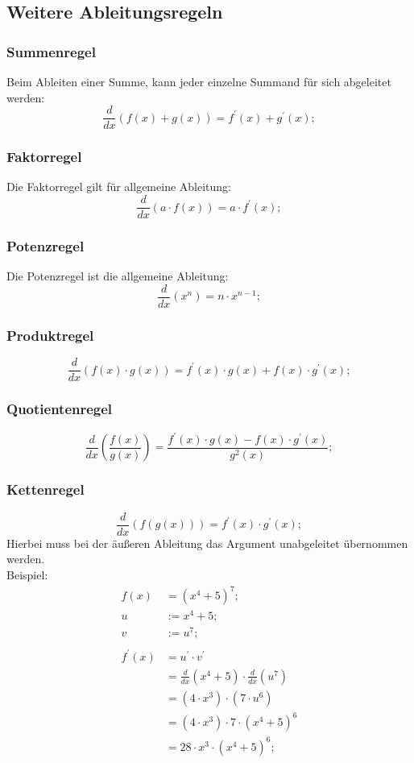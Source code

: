 \documentclass[a4paper]{article}
\begin{document}
\subsection{Weitere Ableitungsregeln}

\subsubsection{Summenregel}
Beim Ableiten einer Summe, kann jeder einzelne Summand für sich abgeleitet werden:
\[
	\frac{d}{dx} \left( f(x) + g(x) \right) = f^\prime(x) + g^\prime(x) ;
\]

\subsubsection{Faktorregel}
Die Faktorregel gilt für allgemeine Ableitung:
\[
	\frac{d}{dx} \left( a \cdot f(x) \right) = a \cdot f^\prime(x);
\]

\subsubsection{Potenzregel}
Die Potenzregel ist die allgemeine Ableitung:
\[
	\frac{d}{dx} \left( x^n \right) = n \cdot x^{n - 1} ;
\]

\subsubsection{Produktregel}
\[
	\frac{d}{dx} \left( f(x) \cdot g(x) \right) = f^\prime(x) \cdot g(x) + f(x) \cdot g^\prime(x) ;
\]

\subsubsection{Quotientenregel}
\[
	\frac{d}{dx} \left( \frac{f(x)}{g(x)} \right) = \frac{f^\prime(x) \cdot g(x) - f(x) \cdot g^\prime(x)}{ g^2(x) } ;
\]

\subsubsection{Kettenregel}
\[
	\frac{d}{dx} \left( f(g(x))  \right) = f^\prime(x) \cdot g^\prime(x) ;
\]
Hierbei muss bei der äußeren Ableitung das Argument unabgeleitet übernommen werden.
\\ Beispiel:
\begin{align*}
	f(x) &= (x^4 + 5)^7 ;
	\\
	u &:= x^4 + 5 ;
	\\
	v &:= u^7 ;
	\\
	\\
	f^\prime(x) &= u^\prime \cdot v^\prime
	\\
	&= \frac{d}{dx} \left( x^4 + 5 \right) \cdot \frac{d}{dx} \left( u^7 \right)
	\\
	&= (4 \cdot x^3) \cdot (7 \cdot u^6)
	\\
	&= (4 \cdot x^3) \cdot 7 \cdot (x^4 + 5)^6
	\\
	&= 28 \cdot x^3 \cdot (x^4 + 5)^6 ;
\end{align*}
\end{document}
